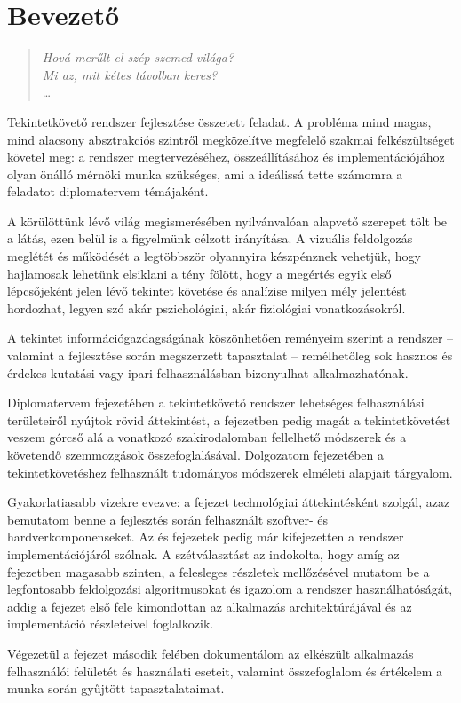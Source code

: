\chapter*{Bevezető}

\begin{verse}
\begin{flushright}
\emph{Hová merűlt el szép szemed világa? \\
Mi az, mit kétes távolban keres?} \\
\dots
\end{flushright}
\end{verse}

Tekintetkövető rendszer fejlesztése összetett feladat. A probléma mind magas, mind alacsony absztrakciós szintről megközelítve megfelelő szakmai felkészültséget követel meg: a rendszer megtervezéséhez, összeállításához és implementációjához olyan önálló mérnöki munka szükséges, ami a ideálissá tette számomra a feladatot diplomatervem témájaként.

\bigskip

A körülöttünk lévő világ megismerésében nyilvánvalóan alapvető szerepet tölt be a látás, ezen belül is a figyelmünk célzott irányítása. A vizuális feldolgozás meglétét és működését a legtöbbször olyannyira készpénznek vehetjük, hogy hajlamosak lehetünk elsiklani a tény fölött, hogy a megértés egyik első lépcsőjeként jelen lévő tekintet követése és analízise milyen mély jelentést hordozhat, legyen szó akár pszichológiai, akár fiziológiai vonatkozásokról.

A tekintet információgazdagságának köszönhetően reményeim szerint a rendszer -- valamint a fejlesztése során megszerzett tapasztalat -- remélhetőleg sok hasznos és érdekes kutatási vagy ipari felhasználásban bizonyulhat alkalmazhatónak.

\bigskip

Diplomatervem  fejezetében a tekintetkövető rendszer lehetséges felhasználási területeiről nyújtok rövid áttekintést, a  fejezetben pedig magát a tekintetkövetést veszem górcső alá a vonatkozó szakirodalomban fellelhető módszerek és a követendő szemmozgások összefoglalásával. Dolgozatom  fejezetében a tekintetkövetéshez felhasznált tudományos módszerek elméleti alapjait tárgyalom.

Gyakorlatiasabb vizekre evezve: a  fejezet technológiai áttekintésként szolgál, azaz bemutatom benne a fejlesztés során felhasznált szoftver- és hardverkomponenseket. Az  és  fejezetek pedig már kifejezetten a rendszer implementációjáról szólnak. A szétválasztást az indokolta, hogy amíg az  fejezetben magasabb szinten, a felesleges részletek mellőzésével mutatom be a legfontosabb feldolgozási algoritmusokat és igazolom a rendszer használhatóságát, addig a  fejezet első fele kimondottan az alkalmazás architektúrájával és az implementáció részleteivel foglalkozik.

Végezetül a  fejezet második felében dokumentálom az elkészült alkalmazás felhasználói felületét és használati eseteit, valamint összefoglalom és értékelem a munka során gyűjtött tapasztalataimat.